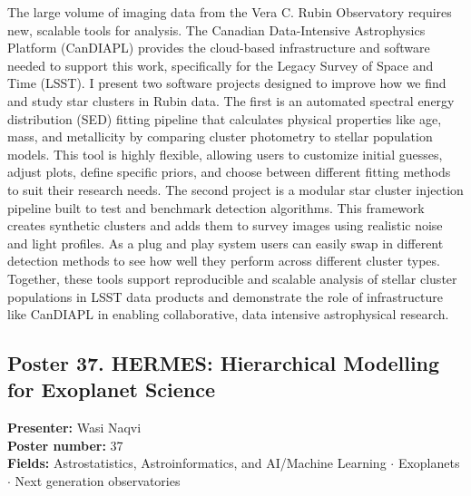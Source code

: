 The large volume of imaging data from the Vera C. Rubin Observatory requires new, scalable tools for analysis. The Canadian Data-Intensive Astrophysics Platform (CanDIAPL) provides the cloud-based infrastructure and software needed to support this work, specifically for the Legacy Survey of Space and Time (LSST). I present two software projects designed to improve how we find and study star clusters in Rubin data. The first is an automated spectral energy distribution (SED) fitting pipeline that calculates physical properties like age, mass, and metallicity by comparing cluster photometry to stellar population models. This tool is highly flexible, allowing users to customize initial guesses, adjust plots, define specific priors, and choose between different fitting methods to suit their research needs. The second project is a modular star cluster injection pipeline built to test and benchmark detection algorithms. This framework creates synthetic clusters and adds them to survey images using realistic noise and light profiles. As a plug and play system users can easily swap in different detection methods to see how well they perform across different cluster types. Together, these tools support reproducible and scalable analysis of stellar cluster populations in LSST data products and demonstrate the role of infrastructure like CanDIAPL in enabling collaborative, data intensive astrophysical research.

\hypertarget{poster-abstract-talk-95}{}\label{poster-abstract-page-talk-95}
\subsection*{Poster 37. HERMES: Hierarchical Modelling for Exoplanet Science}
\textbf{Presenter:} Wasi Naqvi\\
\textbf{Poster number:} 37\\
\textbf{Fields:} Astrostatistics, Astroinformatics, and AI/Machine Learning $\cdot$ Exoplanets $\cdot$ Next generation observatories

